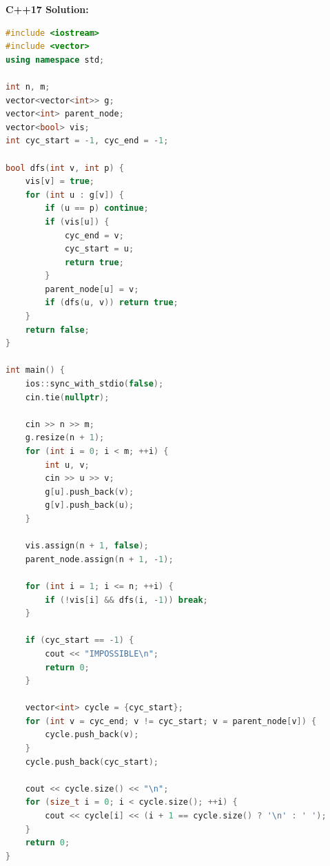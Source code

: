 \documentclass[11pt]{article}
\begin{document}
\textbf{C++17 Solution:}
\begin{lstlisting}[language=C++]
#include <iostream>
#include <vector>
using namespace std;

int n, m;
vector<vector<int>> g;
vector<int> parent_node;
vector<bool> vis;
int cyc_start = -1, cyc_end = -1;

bool dfs(int v, int p) {
    vis[v] = true;
    for (int u : g[v]) {
        if (u == p) continue;
        if (vis[u]) {
            cyc_end = v;
            cyc_start = u;
            return true;
        }
        parent_node[u] = v;
        if (dfs(u, v)) return true;
    }
    return false;
}

int main() {
    ios::sync_with_stdio(false);
    cin.tie(nullptr);

    cin >> n >> m;
    g.resize(n + 1);
    for (int i = 0; i < m; ++i) {
        int u, v;
        cin >> u >> v;
        g[u].push_back(v);
        g[v].push_back(u);
    }

    vis.assign(n + 1, false);
    parent_node.assign(n + 1, -1);

    for (int i = 1; i <= n; ++i) {
        if (!vis[i] && dfs(i, -1)) break;
    }

    if (cyc_start == -1) {
        cout << "IMPOSSIBLE\n";
        return 0;
    }

    vector<int> cycle = {cyc_start};
    for (int v = cyc_end; v != cyc_start; v = parent_node[v]) {
        cycle.push_back(v);
    }
    cycle.push_back(cyc_start);

    cout << cycle.size() << "\n";
    for (size_t i = 0; i < cycle.size(); ++i) {
        cout << cycle[i] << (i + 1 == cycle.size() ? '\n' : ' ');
    }
    return 0;
}
\end{lstlisting}
\end{document}

